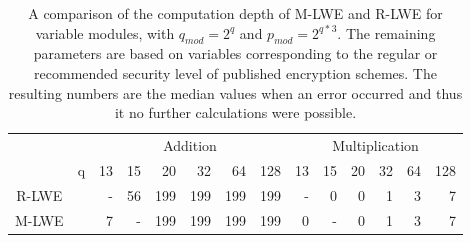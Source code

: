 
\begin{table}[h]
  \centering
  \caption[M-LWE and R-LWE computation depth comparison]{A comparison of the computation depth of M-LWE and R-LWE for variable modules, with $q_{mod} = 2^q$ and $p_{mod}=2^{q*3}$. The remaining parameters are based on variables corresponding to the regular or recommended security level of published encryption schemes. The resulting numbers are the median values when an error occurred and thus it no further calculations were possible.}
  
  \begin{tabular}{|cc|rrrrrr|rrrrrr|}
    \toprule
    &                                   & \multicolumn{6}{|c|}{Addition} & \multicolumn{6}{|c|}{Multiplication}                                                        \\
    &q                                  & 13                        & 15                        & 20  & 32  & 64  & 128 & 13 & 15 & 20 & 32 & 64 & 128 \\
    \midrule
    R-LWE  \cite{CyrstalsKyber}       & & -                         & 56                        & 199 & 199 & 199 & 199 & -  & 0  & 0  & 1  & 3  & 7   \\
    M-LWE  \cite{PracticalKeyExchange}& & 7                         & -                         & 199 & 199 & 199 & 199 & 0  & -  & 0  & 1  & 3  & 7   \\
    \bottomrule
  \end{tabular}
  \label{table:depthComparison}
\end{table}
